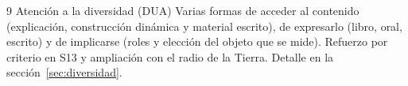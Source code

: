 \par\vspace{10pt}

\begin{tarjeta}{9 Atención a la diversidad (DUA)}
  Varias formas de acceder al contenido (explicación, construcción dinámica y material escrito), de expresarlo (libro, oral, escrito) y de implicarse (roles y elección del objeto que se mide). Refuerzo por criterio en S13 y ampliación con el radio de la Tierra. Detalle en la sección~\ref{sec:diversidad}.
\end{tarjeta}
